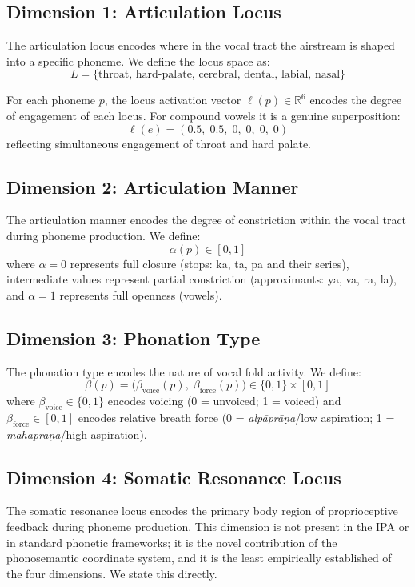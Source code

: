 \documentclass[12pt]{article}
\begin{document}
\subsection{Dimension 1: Articulation Locus}

The articulation locus encodes where in the vocal tract the airstream is shaped into a specific phoneme. We define the locus space as:
\[
L = \{\text{throat, hard-palate, cerebral, dental, labial, nasal}\}
\]

For each phoneme $p$, the locus activation vector $\ell(p) \in \mathbb{R}^6$ encodes the degree of engagement of each locus. For compound vowels it is a genuine superposition:
\[
\ell(e) = (0.5,\; 0.5,\; 0,\; 0,\; 0,\; 0)
\]
reflecting simultaneous engagement of throat and hard palate.

\subsection{Dimension 2: Articulation Manner}

The articulation manner encodes the degree of constriction within the vocal tract during phoneme production. We define:
\[
\alpha(p) \in [0,1]
\]
where $\alpha = 0$ represents full closure (stops: ka, ta, pa and their series), intermediate values represent partial constriction (approximants: ya, va, ra, la), and $\alpha = 1$ represents full openness (vowels).

\subsection{Dimension 3: Phonation Type}

The phonation type encodes the nature of vocal fold activity. We define:
\[
\beta(p) = \bigl(\beta_\text{voice}(p),\; \beta_\text{force}(p)\bigr) \in \{0,1\} \times [0,1]
\]
where $\beta_\text{voice} \in \{0,1\}$ encodes voicing (0 = unvoiced; 1 = voiced) and $\beta_\text{force} \in [0,1]$ encodes relative breath force (0 = \textit{alp\={a}pr\={a}\d{n}a}/low aspiration; 1 = \textit{mah\={a}pr\={a}\d{n}a}/high aspiration).

\subsection{Dimension 4: Somatic Resonance Locus}

The somatic resonance locus encodes the primary body region of proprioceptive feedback during phoneme production. This dimension is not present in the IPA or in standard phonetic frameworks; it is the novel contribution of the phonosemantic coordinate system, and it is the least empirically established of the four dimensions. We state this directly.
\end{document}
